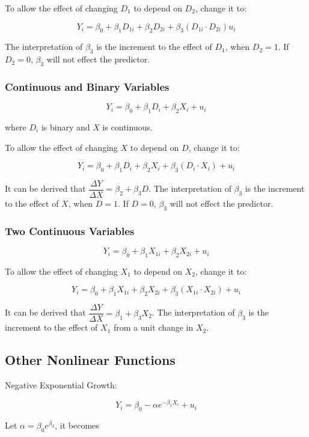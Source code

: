 \documentclass{article}
\begin{document}
To allow the effect of changing $D_1$ to depend on $D_2$, change it to:

\[
	Y_i = \beta_0 + \beta_1 D_{1i} + \beta_2 D_{2i} + \beta_3 (D_{1i} \cdot D_{2i}) u_i
\]

The interpretation of $\beta_3$ is the increment to the effect of $D_1$, when $D_2 = 1$.
If $D_2=0$, $\beta_3$ will not effect the predictor.

\subsubsection{Continuous and Binary Variables}

\[
	Y_i = \beta_0 + \beta_1 D_i + \beta_2 X_i + u_i
\]

where $D_i$ is binary and $X$ is continuous.

To allow the effect of changing $X$ to depend on $D$, change it to:

\[
	Y_i = \beta_0 + \beta_1 D_i + \beta_2 X_i + \beta_3 (D_i \cdot X_i) + u_i
\]

It can be derived that $\dfrac{\Delta Y}{\Delta X} = \beta_2 + \beta_3 D$.
The interpretation of $\beta_3$ is the increment to the effect of $X$, when $D=1$.
If $D=0$, $\beta_3$ will not effect the predictor.

\subsubsection{Two Continuous Variables}

\[
	Y_i = \beta_0 + \beta_1 X_{1i} + \beta_2 X_{2i} + u_i
\]

To allow the effect of changing $X_1$ to depend on $X_2$, change it to:

\[
	Y_i = \beta_0 + \beta_1 X_{1i} + \beta_2 X_{2i} + \beta_3 (X_{1i} \cdot X_{2i}) + u_i
\]

It can be derived that $\dfrac{\Delta Y}{\Delta X} = \beta_1 + \beta_3 X_2$.
The interpretation of $\beta_3$ is the increment to the effect of $X_1$ from a unit change in $X_2$.

\subsection{Other Nonlinear Functions}

Negative Exponential Growth:

\[
	Y_i = \beta_0 - \alpha e ^{-\beta_1 X_i} + u_i
\]

Let $\alpha = \beta_0 e^{\beta_2}$, it becomes
\end{document}

